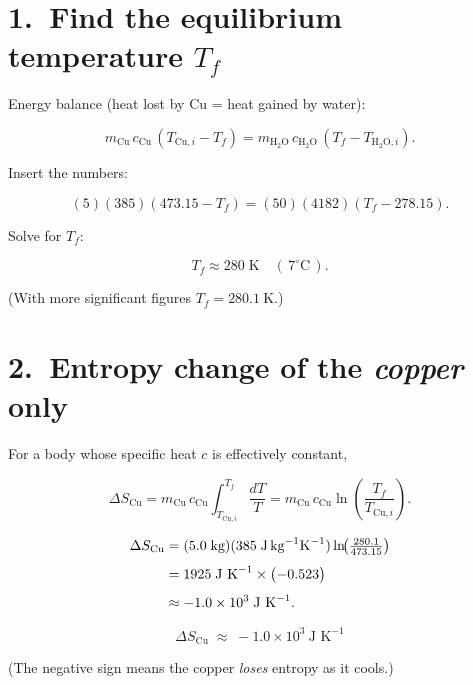 \documentclass[12pt]{article}
\theoremstyle{definition} %
\theoremstyle{plain} %
\begin{document}
\section*{1.\ Find the equilibrium temperature \(T_f\)}

Energy balance (heat lost by Cu = heat gained by water):

\[
m_{\mathrm{Cu}}\,c_{\mathrm{Cu}}\,(T_{\mathrm{Cu},i}-T_f)
   = m_{\mathrm{H_2O}}\,c_{\mathrm{H_2O}}\,(T_f-T_{\mathrm{H_2O},i}).
\]

Insert the numbers:

\[
(5)(385)(473.15-T_f)
   = (50)(4182)(T_f-278.15).
\]

Solve for \(T_f\):

\[
T_f \approx 280\;\text{K}\quad(\,7^{\circ}\text{C}\,).
\]

(With more significant figures \(T_f = 280.1\ \text{K}\).)

\section*{2.\ Entropy change of the \emph{copper} only}

For a body whose specific heat \(c\) is effectively constant,

\[
\Delta S_{\mathrm{Cu}}
   = m_{\mathrm{Cu}}\,c_{\mathrm{Cu}}
     \int_{T_{\mathrm{Cu},i}}^{T_f}\frac{dT}{T}
   = m_{\mathrm{Cu}}\,c_{\mathrm{Cu}}
     \ln\!\left(\frac{T_f}{T_{\mathrm{Cu},i}}\right).
\]

\[
\begin{aligned}
\Delta S_{\mathrm{Cu}}
 &= (5.0\;\text{kg})(385\;\text{J\,kg}^{-1}\text{K}^{-1})
    \ln\!\bigl(\tfrac{280.1}{473.15}\bigr) \\[4pt]
 &= 1925\;\text{J K}^{-1}\times
    \bigl(-0.523\bigr) \\[4pt]
 &\approx -1.0\times10^{3}\;\text{J K}^{-1}.
\end{aligned}
\]

\[
\boxed{\;\Delta S_{\mathrm{Cu}}\;\approx\;-1.0\times10^{3}\ \text{J K}^{-1}\;}
\]

(The negative sign means the copper \emph{loses} entropy as it cools.)
\end{document}
